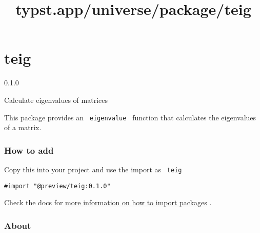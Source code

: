 \title{typst.app/universe/package/teig}

\label{banner}
\section{teig}\label{teig}

{ 0.1.0 }

Calculate eigenvalues of matrices

\label{readme}
This package provides an \texttt{\ eigenvalue\ } function that
calculates the eigenvalues of a matrix.

\begin{Shaded}
\begin{Highlighting}[]

\NormalTok{)}


\NormalTok{$}
\NormalTok{$}

\NormalTok{$}
\NormalTok{$}
\end{Highlighting}
\end{Shaded}


\subsubsection{How to add}\label{how-to-add}

Copy this into your project and use the import as \texttt{\ teig\ }

\begin{verbatim}
#import "@preview/teig:0.1.0"
\end{verbatim}



Check the docs for
\href{https://typst.app/docs/reference/scripting/\#packages}{more
information on how to import packages} .

\subsubsection{About}\label{about}


